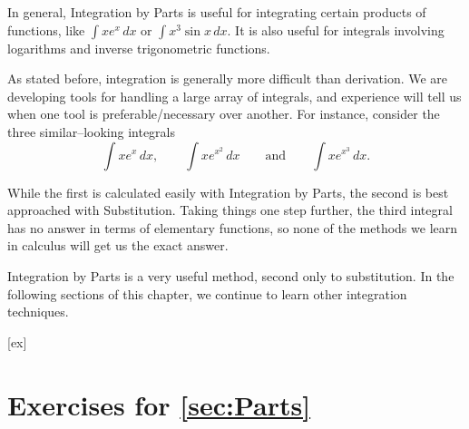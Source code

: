 In general, Integration by Parts is useful for integrating certain products of functions, like $\int x e^x\,dx$ or $\int x^3\sin x\,dx$.   It is also useful for integrals involving logarithms and inverse trigonometric functions.  

As stated before, integration is generally more difficult than derivation. We are developing tools for handling a large array of integrals, and experience will tell us when one tool is preferable/necessary over another. For instance, consider the three similar--looking integrals 
$$\int xe^x\,dx, \qquad  \int x e^{x^2}\,dx \qquad \text{and} \qquad \int xe^{x^3}\,dx.$$

While the first is calculated easily with Integration by Parts, the second is best approached with Substitution.  Taking things one step further, the third integral has no answer in terms of elementary functions, so none of the methods we learn in calculus will get us the exact answer.

Integration by Parts is a very useful method, second only to substitution. In the following sections of this chapter, we continue to learn other integration techniques.  
								
								
								

[ex]
\section*{Exercises for \ref{sec:Parts}}

